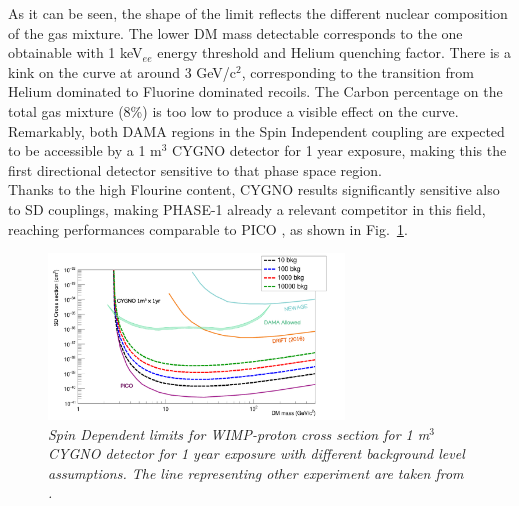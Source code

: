 \documentclass[physics,article,submit,moreauthors,pdftex]{Definitions/mdpi}
\begin{document}
As it can be seen, the shape of the limit reflects the different nuclear composition of the gas mixture. The lower DM mass detectable corresponds to the one obtainable with 1 keV$_{ee}$ energy threshold and Helium quenching factor. There is a kink on the curve at around 3 GeV/c$^2$, corresponding to the transition from Helium dominated to Fluorine dominated recoils. The Carbon percentage on the total gas mixture (8\%) is too low to produce a visible effect on the curve. Remarkably, both DAMA regions in the Spin Independent coupling are expected to be accessible by a 1 m$^3$ CYGNO detector for 1 year exposure, making this the first directional detector sensitive to that phase space region.\\
Thanks to the high Flourine content, CYGNO results significantly sensitive also to SD couplings, making PHASE-1 already a relevant competitor in this field, reaching performances comparable to PICO \cite{bib:Amole_2019}, as shown in Fig.~\ref{fig:SD}. 
\begin{figure}[t!]
\centering
 \includegraphics[width=0.7\textwidth]{1m3_1y_SD.pdf}
 \caption{\textit{Spin Dependent limits for WIMP-proton cross section for 1 m$^3$ CYGNO detector for 1 year exposure with different background level assumptions. The line representing other experiment are taken from \cite{bib:Savage_2004,bib:Battat_2017,bib:Amole_2019,bib:yakabe2020limits}.}}
 \label{fig:SD}
 \end{figure}
\end{document}
